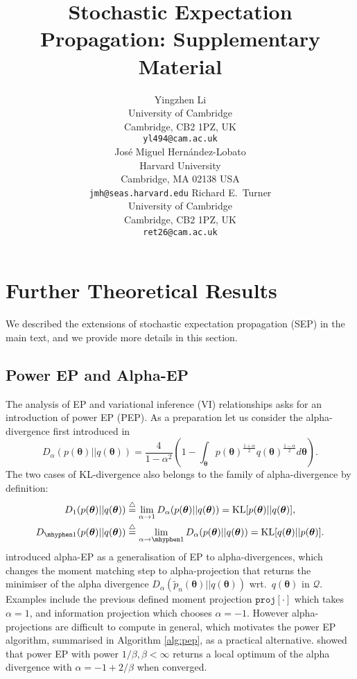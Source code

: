 \documentclass{article} %
\title{Stochastic Expectation Propagation: Supplementary Material}
\author{
Yingzhen Li \\
University of Cambridge\\
Cambridge, CB2 1PZ, UK \\
\texttt{yl494@cam.ac.uk} \\
\And
Jos\'e Miguel Hern\'andez-Lobato\\
Harvard University \\
Cambridge, MA 02138 USA \\
\texttt{jmh@seas.harvard.edu}
\And
Richard E.~Turner \\
University of Cambridge\\
Cambridge, CB2 1PZ, UK \\
\texttt{ret26@cam.ac.uk} \\
}
\begin{document}
\maketitle

\appendix

\section{Further Theoretical Results}
We described the extensions of stochastic expectation propagation (SEP) in the main text, and we provide more details in this section.
\subsection{Power EP and Alpha-EP}
The analysis of EP and variational inference (VI) relationships asks for an introduction of power EP (PEP). As a preparation let us consider the alpha-divergence first introduced in \cite{amari:ig1985}
\begin{equation}
D_{\alpha}(p(\bm{\theta}) || q(\bm{\theta})) = \frac{4}{1 - \alpha^2} 
		\left( 1 - \int_{\bm{\theta}} p(\bm{\theta})^{ \frac{1+\alpha}{2}} q(\bm{\theta})^{ \frac{1- \alpha}{2}} d\bm{\theta} \right).
\end{equation} 
The two cases of KL-divergence also belongs to the family of alpha-divergence by definition:
\begin{align}
D_{1}(p(\bm{\theta})||q(\bm{\theta})) &\buildrel\triangle\over = \lim_{\alpha \rightarrow 1} D_{\alpha}(p(\bm{\theta})||q(\bm{\theta}))  = \mathrm{KL}[p(\bm{\theta}) || q(\bm{\theta})], \\
D_{ \mhyphen 1}(p(\bm{\theta})||q(\bm{\theta})) &\buildrel\triangle\over = \lim_{\alpha \rightarrow \mhyphen 1} D_{\alpha}(p(\bm{\theta}) || q(\bm{\theta}))  = \mathrm{KL}[q(\bm{\theta}) || p(\bm{\theta})].
\end{align}
\cite{minka:powerep} introduced alpha-EP as a generalisation of EP to alpha-divergences, which changes the moment matching step to alpha-projection \cite{amari:alpha_proj} that returns the minimiser of the alpha divergence $D_{\alpha}(\tilde{p}_n(\bm{\theta}) || q(\bm{\theta}))$ wrt.~$q(\bm{\theta})$ in $\mathcal{Q}$. Examples include the previous defined moment projection $\mathtt{proj}[\cdot]$ which takes $\alpha = 1$, and information projection which chooses $\alpha = -1$. However alpha-projections are difficult to compute in general, which motivates the power EP algorithm, summarised in Algorithm \ref{alg:pep}, as a practical alternative. \cite{minka:powerep} showed that power EP with power $1 / \beta, \beta < \infty$ returns a local optimum of the alpha divergence with $\alpha = -1 + 2 / \beta$ when converged. 
\end{document}
